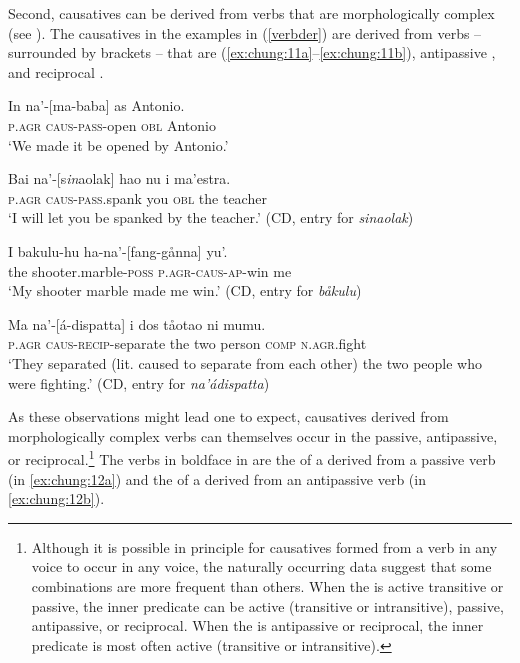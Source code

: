 \documentclass[output=paper,
modfonts
]{LSP/langsci}
\begin{document}
\begin{exe}
\begin{xlist}
Second, causatives can be derived from verbs that are morphologically
complex (see \citealt[114--121]{gibson1980}). The causatives in the examples in
(\ref{verbder}) are derived from verbs -- surrounded by brackets -- that are 
(\ref{ex:chung:11a}--\ref{ex:chung:11b}), antipassive , and reciprocal .

\begin{exe}
\ex \label{ex:chung:11}\label{verbder}
\begin{xlist}
\ex \label{ex:chung:11a}
\gll In na'-{[}ma-baba{]} as Antonio.\\
\textsc{p.agr} \textsc{caus-pass-}open \textsc{obl} Antonio\\
\glt `We made it be opened by Antonio.'

\ex \label{ex:chung:11b} \gll Bai na'-{[}s\emph{in}aolak{]} hao nu i ma'estra.\\
\textsc{p.agr} \textsc{caus-pass.}spank you \textsc{obl} the teacher\\

\glt `I will let you be spanked by the teacher.' (CD, entry for \emph{sinaolak})

\ex \label{ex:chung:11c} \gll  I bakulu-hu ha-na'-{[}fang-gånna{]} yu'.\\
the shooter.marble-\textsc{poss} \textsc{p.agr-caus-ap-}win me\\
\glt `My shooter marble made me win.' (CD, entry for \emph{båkulu})

\ex \label{ex:chung:11d} \gll Ma na'-{[}á-dispatta{]} i dos tåotao ni mumu.\\
\textsc{p.agr} \textsc{caus-recip-}separate the two person \textsc{comp} \textsc{n.agr.}fight\\
\glt `They separated (lit. caused to separate from each other) the two people
who were fighting.' (CD, entry for \emph{na'ádispatta})
\end{xlist}
\end{exe}


As these observations might lead one to expect, causatives derived from
morphologically complex verbs can themselves occur in the passive,
antipassive, or reciprocal.\footnote{Although it is possible in
  principle for causatives formed from a verb in any voice to occur in
  any voice, the naturally occurring data suggest that some combinations
  are more frequent than others. When the  is active transitive
  or passive, the inner predicate can be active (transitive or
  intransitive), passive, antipassive, or reciprocal. When the 
  is antipassive or reciprocal, the inner predicate is most often active
  (transitive or intransitive).} The verbs in boldface in  are the
 of a  derived from a passive verb (in \ref{ex:chung:12a}) and the
 of a  derived from an antipassive verb (in \ref{ex:chung:12b}).


\end{xlist}
\end{exe}
\end{document}
